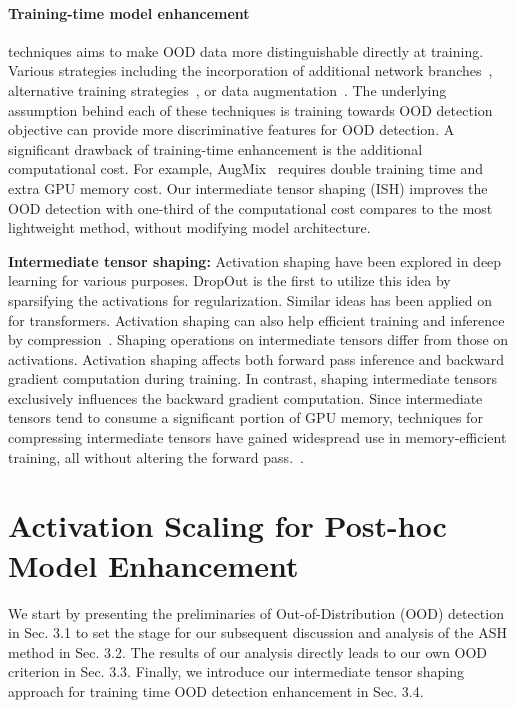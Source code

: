 \documentclass{article} %
\theoremstyle{plain}
\begin{document}
\paragraph{Training-time model enhancement} techniques aims to make OOD data more distinguishable directly at training.  Various strategies including the incorporation of additional network branches~\citep{DBLP:journals/corr/abs-1802-04865/ConfBranch}, alternative training strategies~\citep{DBLP:conf/icml/WeiXCF0L22/LogitNorm}, or data augmentation~\citep{DBLP:conf/nips/PintoYLTD22/RegMixup,DBLP:conf/iclr/HendrycksMCZGL20/AugMix}.  The underlying assumption behind each of these techniques is training towards OOD detection objective can provide more discriminative features for OOD detection.
A significant drawback of training-time enhancement is the additional computational cost. For example, AugMix~\citep{DBLP:conf/iclr/HendrycksMCZGL20/AugMix} requires double training time and extra GPU memory cost. 
Our intermediate tensor shaping (ISH) improves the OOD detection with one-third of the computational cost compares to the most lightweight method, without modifying model architecture.


\textbf{Intermediate tensor shaping:}
Activation shaping have been explored in deep learning for various purposes. DropOut is the first to utilize this idea by sparsifying the activations for regularization. Similar ideas has been applied on~\cite{DBLP:conf/iclr/LiYBLRRYCYGK23/Lazy} for transformers. Activation shaping can also help efficient training and inference by compression~\citep{DBLP:conf/icml/KurtzKGMCGLMSA20/Inducing, DBLP:conf/cvpr/ChenLTYZH23/SparseViT}.
Shaping operations on intermediate tensors differ from those on activations. Activation shaping affects both forward pass inference and backward gradient computation during training. In contrast, shaping intermediate tensors exclusively influences the backward gradient computation. Since intermediate tensors tend to consume a significant portion of GPU memory, techniques for compressing intermediate tensors have gained widespread use in memory-efficient training, all without altering the forward pass.~\citep{DBLP:conf/nips/EvansA21/AC-GC, DBLP:conf/icml/LiuZWCCHCLTGMC22/GACT,  DBLP:conf/iclr/ChenXWCY23/DropIT}. 

\section{Activation Scaling for Post-hoc Model Enhancement}

We start by presenting the preliminaries of Out-of-Distribution (OOD) detection in Sec. 3.1 to set the stage for our subsequent discussion and analysis of the ASH method in Sec. 3.2. The results of our analysis directly leads to our own OOD criterion in Sec. 3.3.  Finally, we introduce our intermediate tensor shaping approach for training time OOD detection enhancement in Sec. 3.4.
\end{document}
